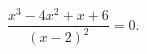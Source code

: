 \begin{ex}[type=equation]
	\begin{condition}
		$\dfrac{x^3 - 4x^2 + x +6}{(x - 2)^2} =0.$
	\end{condition}
\end{ex}
